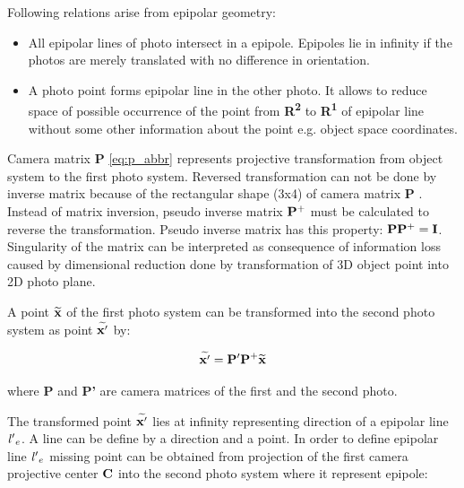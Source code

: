 \documentclass[a4paper,12pt]{article}
\newcommand{\ematr}[1]{%
{\bf #1}%
}
\newcommand{\evect}[1]{%
{\bf #1}%
}
\newcommand{\ehvect}[1]{%
{\bf \widetilde{#1}}%
}
\newcommand{\escal}[1]{%
{\it #1}%
}
\newcommand{\eucl}[1]{%
{\bf R\textsuperscript{#1}}%
}
\begin{document}

\noindent Following relations arise from epipolar geometry:
\begin{itemize}
\item All epipolar lines of  photo intersect in a epipole. Epipoles lie in infinity
if the photos are merely translated with no difference in orientation.
\item A photo point forms epipolar line in the other photo. It allows to reduce space of possible occurrence of the point 
      from \eucl{2} to \eucl{1} of epipolar line without some other information about the point e.g. object space coordinates. 
\end{itemize}



Camera matrix \ematr{P} \eqref{eq:p_abbr} represents projective transformation from object system to the first photo system.
Reversed transformation can not be done by inverse matrix because of the rectangular shape (3x4) of 
camera matrix \ematr{P}. Instead of matrix inversion,  pseudo inverse matrix $\ematr{P}^{+}$ must be 
calculated to reverse the transformation. Pseudo inverse matrix has this property: $\ematr{P}\ematr{P}^{+} = \ematr{I}$.
Singularity of the matrix can be interpreted as consequence of information loss caused 
by dimensional reduction done by transformation of 3D object point into 2D photo plane.  

A point $\ehvect{x}$ of the  first photo system  
can be transformed into  
 the second photo system as point $\ehvect{x'}$
by:

\begin{equation}
\ehvect{x'} =  \ematr{P'}\ematr{P}^{+}\ehvect{x}
\end{equation}

where \ematr{P} and \ematr{P'} are camera matrices of the first and the second photo.

The transformed point $\ehvect{x'}$ lies at infinity 
representing direction of a epipolar line $\escal{l'}_{e}$. A line can be define by a direction 
and a point. In order to define epipolar line $\escal{l'}_{e}$ missing point can be obtained from 
projection of the first camera projective center $\evect{C}$ into the second photo system where it represent
epipole:
\end{document}
